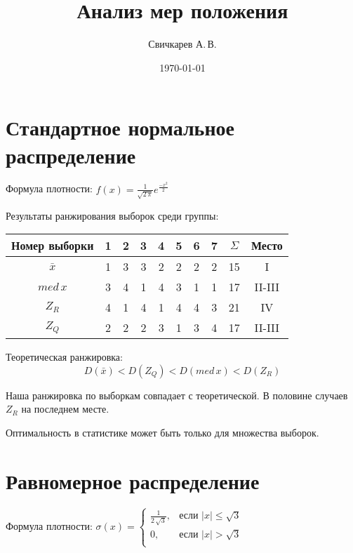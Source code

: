 \documentclass{article} %
\title{Анализ мер положения} %
\author{Свичкарев А.\,В.} %
\date{\today} %
\begin{document}

\maketitle %

\section{Стандартное нормальное распределение}

Формула плотности:
\( f(x) = \frac{1}{\sqrt{ 2\,\pi }}e^{\frac{-x^2}{2}} \)

Результаты ранжирования выборок среди группы:
\begin{center}
	\begin{tabular}{|c| c|c|c|c|c|c|c| c|c|} \hline
		Номер выборки & 1 & 2 & 3 & 4 & 5 & 6 & 7 & \(\Sigma\) & Место \\ \hline
		\(\bar{x}\)   & 1 & 3 & 3 & 2 & 2 & 2 & 2 & 15 & I \\ \hline
		\(med \, x\)      & 3 & 4 & 1 & 4 & 3 & 1 & 1 & 17 & II-III \\ \hline
		\(Z_R\)       & 4 & 1 & 4 & 1 & 4 & 4 & 3 & 21 & IV \\ \hline
		\(Z_Q\)       & 2 & 2 & 2 & 3 & 1 & 3 & 4 & 17 & II-III \\ \hline
	\end{tabular}
\end{center}

Теоретическая ранжировка:
\[ D(\bar{x}) < D(Z_Q) < D(med \, x) < D(Z_R) \]

Наша ранжировка по выборкам совпадает с теоретической. В половине случаев \(Z_R\) на последнем месте.

Оптимальность в статистике может быть только для множества выборок.


\section{Равномерное распределение}
Формула плотности:
\( \sigma(x) = \left\{
	\begin{array}{cl}
		\frac{1}{2 \, \sqrt{3}}, & \mbox{если } \lvert x \rvert \leq \sqrt{3} \\
		0, & \mbox{если } \lvert x \rvert > \sqrt{3}  \\
\end{array} \right. \)
\end{document}
